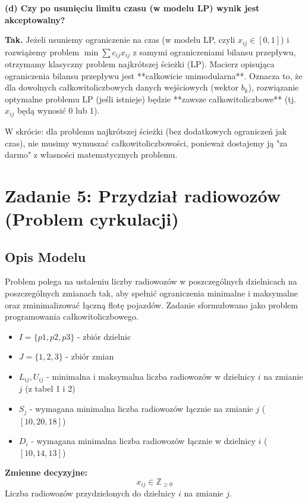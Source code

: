 \documentclass[11pt, a4paper]{article}
\begin{document}
\noindent \textbf{(d) Czy po usunięciu limitu czasu (w modelu LP) wynik jest akceptowalny?}

\textbf{Tak.} Jeżeli usuniemy ograniczenie na czas (w modelu LP, czyli $x_{ij} \in [0, 1]$) i rozwiążemy problem $\min \sum c_{ij} x_{ij}$ z samymi ograniczeniami bilansu przepływu, otrzymamy klasyczny problem najkrótszej ścieżki (LP). Macierz opisująca ograniczenia bilansu przepływu jest **całkowicie unimodularna**. Oznacza to, że dla dowolnych całkowitoliczbowych danych wejściowych (wektor $b_k$), rozwiązanie optymalne problemu LP (jeśli istnieje) będzie **zawsze całkowitoliczbowe** (tj. $x_{ij}$ będą wynosić 0 lub 1).

W skrócie: dla problemu najkrótszej ścieżki (bez dodatkowych ograniczeń jak czas), nie musimy wymuszać całkowitoliczbowości, ponieważ dostajemy ją "za darmo" z własności matematycznych problemu.


\section{Zadanie 5: Przydział radiowozów (Problem cyrkulacji)}

\subsection{Opis Modelu}
Problem polega na ustaleniu liczby radiowozów w poszczególnych dzielnicach na poszczególnych zmianach tak, aby spełnić ograniczenia minimalne i maksymalne oraz zminimalizować łączną flotę pojazdów. Zadanie sformułowano jako problem programowania całkowitoliczbowego.

\begin{itemize}
    \item $I = \{p1, p2, p3\}$ - zbiór dzielnic
    \item $J = \{1, 2, 3\}$ - zbiór zmian
    \item $L_{ij}, U_{ij}$ - minimalna i maksymalna liczba radiowozów w dzielnicy $i$ na zmianie $j$ (z tabel 1 i 2)
    \item $S_j$ - wymagana minimalna liczba radiowozów łącznie na zmianie $j$ ($[10, 20, 18]$)
    \item $D_i$ - wymagana minimalna liczba radiowozów łącznie w dzielnicy $i$ ($[10, 14, 13]$)
\end{itemize}

\noindent \textbf{Zmienne decyzyjne:}
$$ x_{ij} \in \mathbb{Z}_{\ge 0} $$
Liczba radiowozów przydzielonych do dzielnicy $i$ na zmianie $j$.
\end{document}
